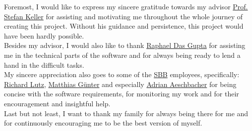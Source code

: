 Foremost, I would like to express my sincere gratitude towards my advisor \href{mailto:stefan.keller@hsr.ch}{Prof. Stefan Keller} for assisting and motivating me throughout the whole journey of creating this project. Without his guidance and persistence, this project would have been hardly possible.\\
Besides my advisor, I would also like to thank \href{mailto:raphael.das.gupta@hsr.ch}{Raphael Das Gupta} for assisting me in the technical parts of the software and for always being ready to lend a hand in the difficult tasks.\\
\newline
My sincere appreciation also goes to some of the \href{https://www.sbb.ch/en/home.html}{SBB} employees, specifically: \href{mailto:richard.lutz@sbb.ch}{Richard Lutz}, \href{mailto:matthias.guenter@sbb.ch}{Matthias Günter} and especially \href{mailto:adrian.aeschbacher2@sbb.ch}{Adrian Aeschbacher} for being concise with the software requirements, for monitoring my work and for their encouragement and insightful help.\\
\newline
Last but not least, I want to thank my family for always being there for me and for continuously encouraging me to be the best version of myself.
